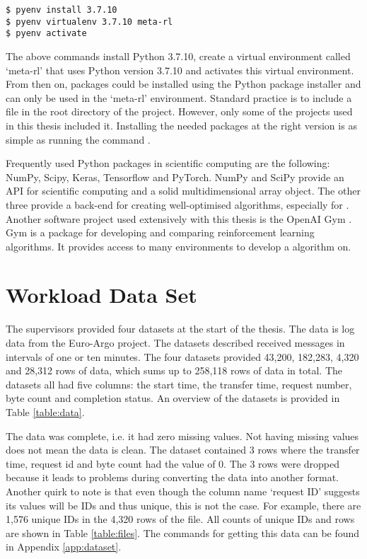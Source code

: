 \begin{verbatim}
$ pyenv install 3.7.10
$ pyenv virtualenv 3.7.10 meta-rl
$ pyenv activate
\end{verbatim}

The above commands install Python 3.7.10, create a virtual environment called
`meta-rl' that uses Python version 3.7.10 and activates this virtual
environment. From then on, packages could be installed using the Python
package installer  and can only be used in the `meta-rl'
environment. Standard practice is to include a  file in
the root directory of the project. However, only some of the projects used in
this thesis included it. Installing the needed packages at the right version
is as simple as running the command .

Frequently used Python packages in scientific computing are the following:
NumPy, Scipy, Keras, Tensorflow and PyTorch\footnotemark. NumPy and SciPy
provide an API for scientific computing and a solid multidimensional array
object. The other three provide a back-end for creating well-optimised \ml
algorithms, especially for \nn. Another software project used extensively with
this thesis is the OpenAI Gym \cite{gym2016}. Gym is a package for developing
and comparing reinforcement learning algorithms. It provides access to many
environments to develop a \rl algorithm on.



\section{Workload Data Set}\label{sec:data}

The supervisors provided four datasets at the start of the thesis. The data is
log data from the Euro-Argo project. The datasets
described received messages in intervals of one or ten minutes. The four
datasets provided 43,200, 182,283, 4,320 and 28,312 rows of data, which sums
up to 258,118 rows of data in total. The datasets all had five columns: the
start time, the transfer time, request number, byte count and completion
status. An overview of the datasets is provided in Table \ref{table:data}.



The data was complete, i.e. it had zero missing values. Not having missing
values does not mean the data is clean. The dataset contained 3 rows where the
transfer time, request id and byte count had the value of 0. The 3 rows were
dropped because it leads to problems during converting the data into
another format. Another quirk to note is that even though the column
name `request ID' suggests its values will be IDs and thus unique, this
is not the case. For example, there are 1,576 unique IDs in the 4,320 rows of
the  file. All counts of unique IDs and rows are
shown in Table \ref{table:files}. The commands for getting this data can be
found in Appendix \ref{app:dataset}.

